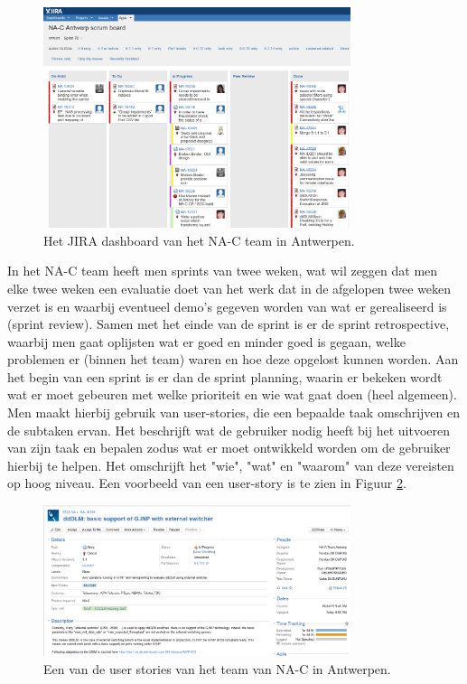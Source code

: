 \documentclass[10pt,a4paper]{article}
\begin{document}
\begin{figure}[ht!]
\centering
\includegraphics[width=90mm]{CaptureJira.png}
\caption{Het JIRA dashboard van het NA-C team in Antwerpen.} 
\label{jira}
\end{figure}

In het NA-C team heeft men sprints van twee weken, wat wil zeggen dat men elke twee weken een evaluatie doet van het werk dat in de afgelopen twee weken verzet is en waarbij eventueel demo's gegeven worden van wat er gerealiseerd is (sprint review). Samen met het einde van de sprint is er de sprint retrospective, waarbij men gaat oplijsten wat er goed en minder goed is gegaan, welke problemen er (binnen het team) waren en hoe deze opgelost kunnen worden. Aan het begin van een sprint is er dan de sprint planning, waarin er bekeken wordt wat er moet gebeuren met welke prioriteit en wie wat gaat doen (heel algemeen). Men maakt hierbij gebruik van user-stories, die een bepaalde taak omschrijven en de subtaken ervan. Het beschrijft wat de gebruiker nodig heeft bij het uitvoeren van zijn taak en bepalen zodus wat er moet ontwikkeld worden om de gebruiker hierbij te helpen. Het omschrijft het "wie", "wat" en "waarom" van deze vereisten op hoog niveau. Een voorbeeld van een user-story is te zien in Figuur \ref{user_story}.

\begin{figure}[ht!]
\centering
\includegraphics[width=90mm]{user_story.png}
\caption{Een van de user stories van het team van NA-C in Antwerpen.} 
\label{user_story}
\end{figure}
\end{document}
